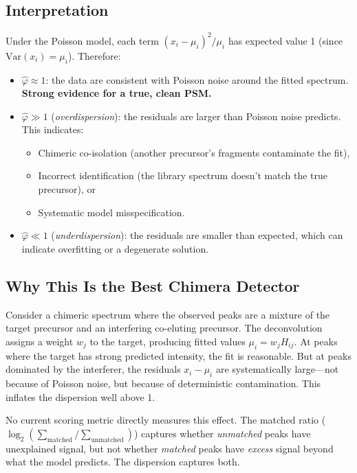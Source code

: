 \documentclass[11pt,a4paper]{article}
\newcommand{\Var}{\mathrm{Var}}
\begin{document}
\subsection{Interpretation}

Under the Poisson model, each term $(x_i - \mu_i)^2 / \mu_i$ has expected value 1
(since $\Var(x_i) = \mu_i$). Therefore:
\begin{itemize}[]
    \item $\hat{\varphi} \approx 1$: the data are consistent with Poisson noise around
          the fitted spectrum. \textbf{Strong evidence for a true, clean PSM.}
    \item $\hat{\varphi} \gg 1$ (\emph{overdispersion}): the residuals are larger than
          Poisson noise predicts. This indicates:
          \begin{itemize}[]
              \item Chimeric co-isolation (another precursor's fragments contaminate the fit),
              \item Incorrect identification (the library spectrum doesn't match the true
                    precursor), or
              \item Systematic model misspecification.
          \end{itemize}
    \item $\hat{\varphi} \ll 1$ (\emph{underdispersion}): the residuals are smaller than
          expected, which can indicate overfitting or a degenerate solution.
\end{itemize}

\subsection{Why This Is the Best Chimera Detector}

Consider a chimeric spectrum where the observed peaks are a mixture of the target precursor
and an interfering co-eluting precursor. The deconvolution assigns a weight $w_j$ to the
target, producing fitted values $\mu_i = w_j H_{ij}$. At peaks where the target has strong
predicted intensity, the fit is reasonable. But at peaks dominated by the interferer, the
residuals $x_i - \mu_i$ are systematically large---not because of Poisson noise, but because
of deterministic contamination. This inflates the dispersion well above 1.

No current scoring metric directly measures this effect. The matched ratio
($\log_2(\sum_{\text{matched}} / \sum_{\text{unmatched}})$) captures whether
\emph{unmatched} peaks have unexplained signal, but not whether \emph{matched} peaks have
\emph{excess} signal beyond what the model predicts. The dispersion captures both.
\end{document}
